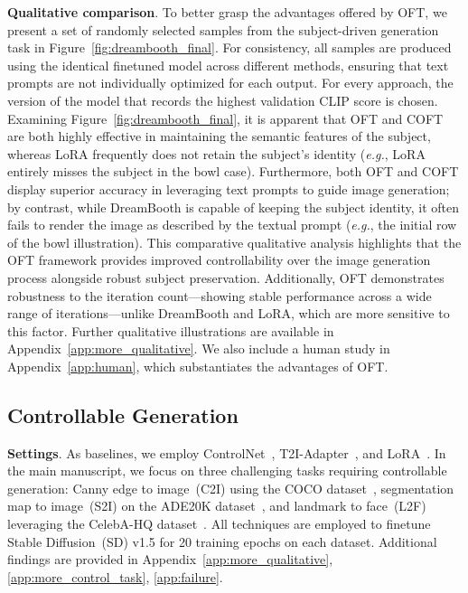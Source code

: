 \textbf{Qualitative comparison}. To better grasp the advantages offered by OFT, we present a set of randomly selected samples from the subject-driven generation task in Figure~\ref{fig:dreambooth_final}. For consistency, all samples are produced using the identical finetuned model across different methods, ensuring that text prompts are not individually optimized for each output. For every approach, the version of the model that records the highest validation CLIP score is chosen. Examining Figure~\ref{fig:dreambooth_final}, it is apparent that OFT and COFT are both highly effective in maintaining the semantic features of the subject, whereas LoRA frequently does not retain the subject's identity (\emph{e.g.}, LoRA entirely misses the subject in the bowl case). Furthermore, both OFT and COFT display superior accuracy in leveraging text prompts to guide image generation; by contrast, while DreamBooth is capable of keeping the subject identity, it often fails to render the image as described by the textual prompt (\emph{e.g.}, the initial row of the bowl illustration). This comparative qualitative analysis highlights that the OFT framework provides improved controllability over the image generation process alongside robust subject preservation. Additionally, OFT demonstrates robustness to the iteration count—showing stable performance across a wide range of iterations—unlike DreamBooth and LoRA, which are more sensitive to this factor. Further qualitative illustrations are available in Appendix~\ref{app:more_qualitative}. We also include a human study in Appendix~\ref{app:human}, which substantiates the advantages of OFT.

\subsection{Controllable Generation}

\textbf{Settings}. As baselines, we employ ControlNet~\cite{zhang2023adding}, T2I-Adapter~\cite{mou2023t2i}, and LoRA~\cite{hulora2022}. In the main manuscript, we focus on three challenging tasks requiring controllable generation: Canny edge to image~(C2I) using the COCO dataset~\cite{lin2014microsoft}, segmentation map to image~(S2I) on the ADE20K dataset~\cite{zhou2017scene}, and landmark to face~(L2F) leveraging the CelebA-HQ dataset~\cite{karras2018progressive,xia2021tedigan}. All techniques are employed to finetune Stable Diffusion~(SD) v1.5 for 20 training epochs on each dataset. Additional findings are provided in Appendix~\ref{app:more_qualitative}, \ref{app:more_control_task}, \ref{app:failure}.

